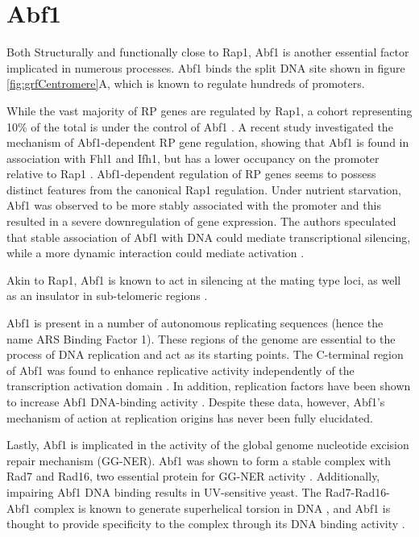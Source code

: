 \section{Abf1}

Both Structurally and functionally close to Rap1, Abf1 is another essential factor implicated in numerous processes. 
Abf1 binds the split DNA site shown in figure \ref{fig:grfCentromere}A, which is known to regulate hundreds of promoters. 

While the vast majority of RP genes are regulated by Rap1, a cohort representing 10\% of the total is under the control of Abf1 \cite{dellaseta:1990:abf1}. 
A recent study investigated the mechanism of Abf1-dependent RP gene regulation, showing that Abf1 is found in association with Fhl1 and Ifh1, but has a lower occupancy on the promoter relative to Rap1 \cite{fermi:2016:multiple}. 
Abf1-dependent regulation of RP genes seems to possess distinct features from the canonical Rap1 regulation. 
Under nutrient starvation, Abf1 was observed to be more stably associated with the promoter and this resulted in a severe downregulation of gene expression. 
The authors speculated that stable association of Abf1 with DNA could mediate transcriptional silencing, while a more dynamic interaction could mediate activation \cite{fermi:2016:promoter}.

Akin to Rap1, Abf1 is known to act in silencing at the mating type loci, as well as an insulator in sub-telomeric regions \cite{mak:2009:dynamic}. 

Abf1 is present in a number of autonomous replicating sequences (hence the name ARS Binding Factor 1). 
These regions of the genome are essential to the process of DNA replication and act as its starting points.
The C-terminal region of Abf1 was found to enhance replicative activity independently of the transcription activation domain \cite{wiltshire:1997:abf1p}. 
In addition, replication factors have been shown to increase Abf1 DNA-binding activity \cite{feng:1998:saccharomyces}. 
Despite these data, however, Abf1’s mechanism of action at replication origins has never been fully elucidated.

Lastly, Abf1 is implicated in the activity of the global genome nucleotide excision repair mechanism (GG-NER). 
Abf1 was shown to form a stable complex with Rad7 and Rad16, two essential protein for GG-NER activity  \cite{reed:1999:yeast}. 
Additionally, impairing Abf1 DNA binding results in UV-sensitive yeast. 
The Rad7-Rad16-Abf1 complex is known to generate superhelical torsion in DNA \cite{yu:2004:yeast}, and Abf1 is thought to provide specificity to the complex through its DNA binding activity \cite{Yu:2009:abf1binding}.

